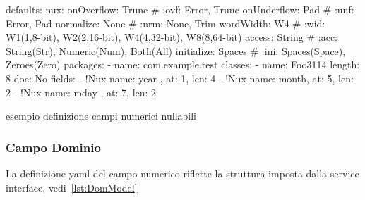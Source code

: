 \documentclass[a4paper,10pt]{report}
\newif\ifesource
\newenvironment{elisting}[1][!htb]
  {\captionsetup{aboveskip=0pt}\begin{listing}[#1]}
  {\end{listing}%
}
\begin{document}
\ifesource
\begin{figure*}[!htb]
\begin{lstlisting}[language=yaml, 
caption={esempio definizione campi numerici nullabili}, 
label=lst:xmplNux]
defaults:
  nux:
    onOverflow: Trunc   # :ovf: Error, Trunc
    onUnderflow: Pad    # :unf: Error, Pad
    normalize: None     # :nrm: None, Trim
    wordWidth: W4       # :wid: W1(1,8-bit), W2(2,16-bit), W4(4,32-bit), W8(8,64-bit)
    access: String      # :acc: String(Str), Numeric(Num), Both(All)
    initialize: Spaces  # :ini: Spaces(Space), Zeroes(Zero)
packages:
  - name: com.example.test
    classes:
      - name: Foo3114
        length: 8
        doc: No
        fields:
          - !Nux { name: year , at: 1, len: 4 }
          - !Nux { name: month, at: 5, len: 2 }
          - !Nux { name: mday , at: 7, len: 2 }
\end{lstlisting}
\end{figure*}
\else
\begin{elisting}
\begin{yamlcode}
defaults:
  nux:
    onOverflow: Trunc   # :ovf: Error, Trunc
    onUnderflow: Pad    # :unf: Error, Pad
    normalize: None     # :nrm: None, Trim
    wordWidth: W4       # :wid: W1(1,8-bit), W2(2,16-bit), W4(4,32-bit), W8(8,64-bit)
    access: String      # :acc: String(Str), Numeric(Num), Both(All)
    initialize: Spaces  # :ini: Spaces(Space), Zeroes(Zero)
packages:
  - name: com.example.test
    classes:
      - name: Foo3114
        length: 8
        doc: No
        fields:
          - !Nux { name: year , at: 1, len: 4 }
          - !Nux { name: month, at: 5, len: 2 }
          - !Nux { name: mday , at: 7, len: 2 }
\end{yamlcode}
\caption{esempio definizione campi numerici nullabili}
\label{lst:xmplNux}
\end{elisting}
\fi

\subsubsection{Campo Dominio} \label{sub:yaml.dom}
La definizione yaml del campo numerico riflette la struttura imposta dalla
service interface, vedi~\ref{lst:DomModel}
\end{document}

